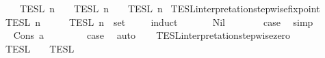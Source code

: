 \begin{isabellebody}
\ \ {\isacharbar}\ {\isacartoucheopen}{\isasymlbrakk}{\isasymlbrakk}\ {\isasymphi}\ {\isacharhash}\ {\isasymPhi}\ {\isasymrbrakk}{\isasymrbrakk}\isactrlsub T\isactrlsub E\isactrlsub S\isactrlsub L\isactrlbsup {\isasymge}\ n\isactrlesup \ {\isacharequal}\ {\isasymlbrakk}\ {\isasymphi}\ {\isasymrbrakk}\isactrlsub T\isactrlsub E\isactrlsub S\isactrlsub L\isactrlbsup {\isasymge}\ n\isactrlesup \ {\isasyminter}\ {\isasymlbrakk}{\isasymlbrakk}\ {\isasymPhi}\ {\isasymrbrakk}{\isasymrbrakk}\isactrlsub T\isactrlsub E\isactrlsub S\isactrlsub L\isactrlbsup {\isasymge}\ n\isactrlesup {\isacartoucheclose}\isanewline
\isanewline
{}\isamarkupfalse%
\ TESL{\isacharunderscore}interpretation{\isacharunderscore}stepwise{\isacharunderscore}fixpoint{\isacharcolon}\isanewline
\ \ {\isacartoucheopen}{\isasymlbrakk}{\isasymlbrakk}\ {\isasymPhi}\ {\isasymrbrakk}{\isasymrbrakk}\isactrlsub T\isactrlsub E\isactrlsub S\isactrlsub L\isactrlbsup {\isasymge}\ n\isactrlesup \ {\isacharequal}\ {\isasymInter}\ {\isacharparenleft}{\isacharparenleft}{\isasymlambda}{\isasymphi}{\isachardot}\ {\isasymlbrakk}\ {\isasymphi}\ {\isasymrbrakk}\isactrlsub T\isactrlsub E\isactrlsub S\isactrlsub L\isactrlbsup {\isasymge}\ n\isactrlesup {\isacharparenright}\ {\isacharbackquote}\ set\ {\isasymPhi}{\isacharparenright}{\isacartoucheclose}\isanewline
%
\isadelimproof
\ \ %
\endisadelimproof
%
\isatagproof
{}\isamarkupfalse%
\ {\isacharparenleft}induct\ {\isasymPhi}{\isacharparenright}\isanewline
\ \ \ \ \isamarkupfalse%
\ Nil\isanewline
\ \ \ \ \isamarkupfalse%
\ \isamarkupfalse%
\ {\isacharquery}case\ \isamarkupfalse%
\ simp\isanewline
\ \ \isamarkupfalse%
\isanewline
\ \ \ \ \isamarkupfalse%
\ {\isacharparenleft}Cons\ a\ {\isasymPhi}{\isacharparenright}\isanewline
\ \ \ \ \isamarkupfalse%
\ \isamarkupfalse%
\ {\isacharquery}case\ \isamarkupfalse%
\ auto\isanewline
\ \ \isamarkupfalse%
%
\endisatagproof
{\isafoldproof}%
%
\isadelimproof
\isanewline
%
\endisadelimproof
\isanewline
{}\isamarkupfalse%
\ TESL{\isacharunderscore}interpretation{\isacharunderscore}stepwise{\isacharunderscore}zero{\isacharcolon}\isanewline
\ \ {\isacartoucheopen}{\isasymlbrakk}\ {\isasymphi}\ {\isasymrbrakk}\isactrlsub T\isactrlsub E\isactrlsub S\isactrlsub L\ {\isacharequal}\ {\isasymlbrakk}\ {\isasymphi}\ {\isasymrbrakk}\isactrlsub T\isactrlsub E\isactrlsub S\isactrlsub L\isactrlbsup {\isasymge}\ {}\isactrlesup {\isacartoucheclose}\isanewline

\end{isabellebody}
